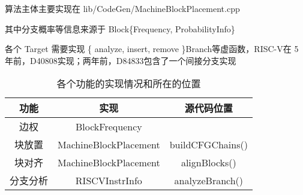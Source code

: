 算法主体主要实现在 lib/CodeGen/MachineBlockPlacement.cpp

\vspace{1.5em}

其中分支概率等信息来源于 Block\{Frequency, ProbabilityInfo\}

\vspace{1.5em}

各个 Target 需要实现 \{ analyze, insert, remove \}Branch等虚函数，RISC-V在 5 年前，D40808\cite{llvmriscvimplbranchanalysis2017}实现；两年前，D84833包含了一个间接分支实现 \cite{llvmriscvimplindirect2020}
\begin{table}
    \begin{tabular}{ccc}
        \toprule
        功能   & 实现                    & 源代码位置                                                                         \\
        \midrule
        边权   & BlockFrequency        & \cite{llvmblockfreqinfoimpl2022}                                              \\
        块放置  & MachineBlockPlacement & buildCFGChains()\cite{llvmmachineblockplacement2022}                          \\
        块对齐  & MachineBlockPlacement & alignBlocks()\cite{llvmmachineblockplacement2022}                             \\
        分支分析 & RISCVInstrInfo        & analyzeBranch()\cite{llvmriscvinstrinfo2022, llvmriscvimplbranchanalysis2017} \\
        \bottomrule
    \end{tabular}
    \caption{各个功能的实现情况和所在的位置}
\end{table}